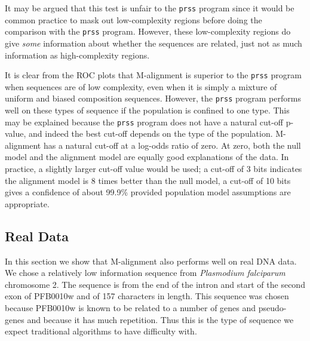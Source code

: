 \documentclass[letterpaper,11pt,oneside]{article}
\begin{document}
\begin{multicols}{2}
It may be argued that this test is unfair to the \verb!prss! program since it
would be common practice to mask out low-complexity regions before doing the
comparison with the \verb!prss! program.  However, these low-complexity
regions do give \emph{some} information about whether the sequences are
related, just not as much information as high-complexity regions.



It is clear from the ROC plots that M-alignment is superior to
the \verb!prss! program when sequences are of low complexity, even when it is
simply a mixture of uniform and biased composition sequences.  However, the
\verb!prss! program performs well on these types of sequence if the population
is confined to one type.  This may be explained because the \verb!prss!
program does not have a natural cut-off p-value, and indeed the best cut-off
depends on the type of the population.  M-alignment has a natural cut-off at a
log-odds ratio of zero.  At zero, both the null model and the alignment model
are equally good explanations of the data.  In practice, a slightly larger
cut-off value would be used; a cut-off of 3 bits indicates the alignment model
is 8 times better than the null model, a cut-off of 10 bits gives a confidence
of about 99.9\% provided population model assumptions are appropriate.


\subsection{Real Data}

In this section we show that M-alignment also performs well on real DNA data.
We chose a relatively low information sequence from \emph{Plasmodium
falciparum} chromosome 2.  The sequence is from the end of the intron and
start of the second exon of PFB0010w and of 157 characters in length.  This
sequence was chosen because PFB0010w is known to be related to a number of
genes and pseudo-genes and because it has much repetition.  Thus this is the
type of sequence we expect traditional algorithms to have difficulty with.



\end{multicols}
\end{document}
